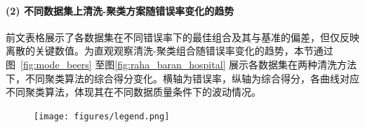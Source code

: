\documentclass[10pt]{article} %
\numberwithin{equation}{section}
\begin{document}
\paragraph{(2) 不同数据集上清洗-聚类方案随错误率变化的趋势}
前文表格展示了各数据集在不同错误率下的最佳组合及其与基准的偏差，但仅反映离散的关键数值。为直观观察清洗-聚类组合随错误率变化的趋势，本节通过图~\ref{fig:mode_beers} 至图\ref{fig:raha_baran_hospital} 展示各数据集在两种清洗方法下，不同聚类算法的综合得分变化。横轴为错误率，纵轴为综合得分，各曲线对应不同聚类算法，体现其在不同数据质量条件下的波动情况。
\begin{figure}[htbp]
    \centering
    \texttt{[image: figures/legend.png]} %
    \vspace{-10pt} %
\end{figure}

\FloatBarrier
\end{document}
